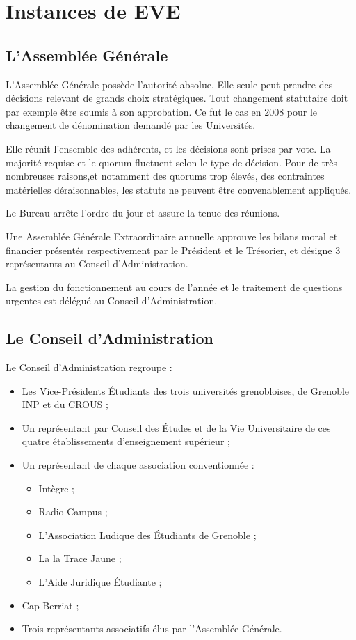 \section{Instances de EVE}
\label{parcoursstruct}

\subsection{L'Assemblée Générale}

L'Assemblée Générale possède l'autorité absolue. Elle seule peut prendre des
décisions relevant de grands choix stratégiques. Tout changement statutaire
doit par exemple être soumis à son approbation. Ce fut le cas en 2008 pour le
changement de dénomination demandé par les Universités.

Elle réunit l'ensemble des adhérents,
et les décisions sont prises par vote.
La majorité requise et le quorum fluctuent selon le type de décision.
Pour de très nombreuses raisons,et notamment des quorums trop élevés,
des contraintes matérielles déraisonnables, les statuts ne peuvent être
convenablement appliqués.

Le Bureau arrête l'ordre du jour et assure la tenue des réunions.

Une Assemblée Générale Extraordinaire annuelle approuve les bilans moral et
financier présentés respectivement par le Président et le Trésorier,
et désigne 3 représentants au Conseil d'Administration.

La gestion du fonctionnement au cours de l'année et le traitement de questions
urgentes est délégué au Conseil d'Administration.

\subsection{Le Conseil d'Administration}

Le Conseil d'Administration regroupe :

\begin{itemize}
\item Les Vice-Présidents Étudiants des trois universités grenobloises, de Grenoble INP et du CROUS ;
\item Un représentant par Conseil des Études et de la Vie Universitaire de ces quatre établissements d'enseignement supérieur ;
\item Un représentant de chaque association conventionnée :
	\begin{itemize}
	\item Intègre ;
	\item Radio Campus ;
	\item L'Association Ludique des Étudiants de Grenoble ;
	\item La la Trace Jaune ;
	\item L'Aide Juridique Étudiante ;
	\end{itemize}
\item Cap Berriat ;
\item Trois représentants associatifs élus par l'Assemblée Générale.
\end{itemize}

